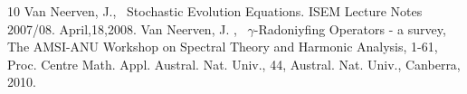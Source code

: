 \documentclass{smfart}
\theoremstyle{plain}
\theoremstyle{definition}
\begin{document}
\begin{thebibliography}{10}
 Van Neerven, J., \  Stochastic Evolution Equations. ISEM Lecture Notes 2007/08. April,18,2008.
 Van Neerven, J. , \  $\gamma$-Radoniyfing Operators - a survey, The AMSI-ANU Workshop on Spectral Theory and Harmonic Analysis, 1-61, Proc. Centre Math. Appl. Austral. Nat. Univ., 44, Austral. Nat. Univ., Canberra, 2010.


\end{thebibliography}
\end{document}
